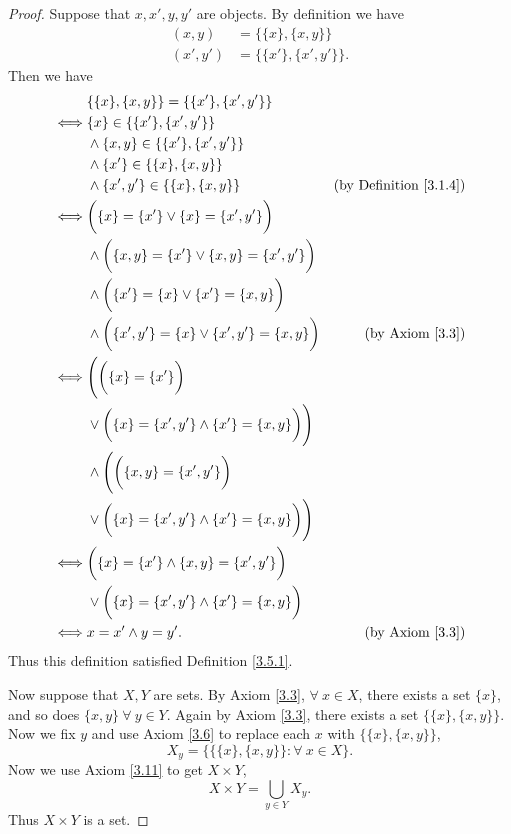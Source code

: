 \begin{proof}
Suppose that \(x, x', y, y'\) are objects.
By definition we have
\begin{align*}
(x, y) &= \{\{x\}, \{x, y\}\} \\
(x', y') &= \{\{x'\}, \{x', y'\}\}.
\end{align*}
Then we have
\begin{align*}
& \{\{x\}, \{x, y\}\} = \{\{x'\}, \{x', y'\}\} \\
\iff & \{x\} \in \{\{x'\}, \{x', y'\}\} \\
& \land \{x, y\} \in \{\{x'\}, \{x', y'\}\} \\
& \land \{x'\} \in \{\{x\}, \{x, y\}\} \\
& \land \{x', y'\} \in \{\{x\}, \{x, y\}\} & \text{(by Definition \ref{3.1.4})} \\
\iff & \bigg(\{x\} = \{x'\} \lor \{x\} = \{x', y'\}\bigg) \\
& \land \bigg(\{x, y\} = \{x'\} \lor \{x, y\} = \{x', y'\}\bigg) \\
& \land \bigg(\{x'\} = \{x\} \lor \{x'\} = \{x, y\}\bigg) \\
& \land \bigg(\{x', y'\} = \{x\} \lor \{x', y'\} = \{x, y\}\bigg) & \text{(by Axiom \ref{3.3})} \\
\iff & \Bigg(\bigg(\{x\} = \{x'\}\bigg) \\
& \lor \bigg(\{x\} = \{x', y'\} \land \{x'\} = \{x, y\}\bigg)\Bigg) \\
& \land \Bigg(\bigg(\{x, y\} = \{x', y'\}\bigg) \\
& \lor \bigg(\{x\} = \{x', y'\} \land \{x'\} = \{x, y\}\bigg)\Bigg) \\
\iff & \bigg(\{x\} = \{x'\} \land \{x, y\} = \{x', y'\}\bigg) \\
& \lor \bigg(\{x\} = \{x', y'\} \land \{x'\} = \{x, y\}\bigg) \\
\iff & x = x' \land y = y'. & \text{(by Axiom \ref{3.3})}
\end{align*}
Thus this definition satisfied Definition \ref{3.5.1}.

Now suppose that \(X, Y\) are sets.
By Axiom \ref{3.3}, \(\forall\ x \in X\), there exists a set \(\{x\}\), and so does \(\{x, y\} \ \forall\ y \in Y\).
Again by Axiom \ref{3.3}, there exists a set \(\{\{x\}, \{x, y\}\}\).
Now we fix \(y\) and use Axiom \ref{3.6} to replace each \(x\) with \(\{\{x\}, \{x, y\}\}\),
\[
    X_y = \{\{\{x\}, \{x, y\}\} : \forall\ x \in X\}.
\]
Now we use Axiom \ref{3.11} to get \(X \times Y\),
\[
    X \times Y = \bigcup_{y \in Y} X_y.
\]
Thus \(X \times Y\) is a set.


\end{proof}
